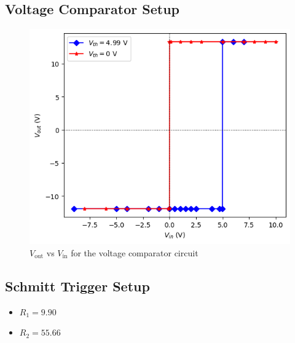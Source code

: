 \subsection{Voltage Comparator Setup}
    
    \begin{figure}[H]
        \centering
        \includegraphics[width=1\columnwidth]{images/ge.png}
        \caption{$V_\text{out}$ vs $V_\text{in}$ for the voltage comparator circuit}
        \label{g3}
    \end{figure}

\subsection{Schmitt Trigger Setup}
    \begin{itemize}
        \item $R_1=9.90$ \kohm
        \item $R_{2}=55.66$ \kohm
    \end{itemize}
    

